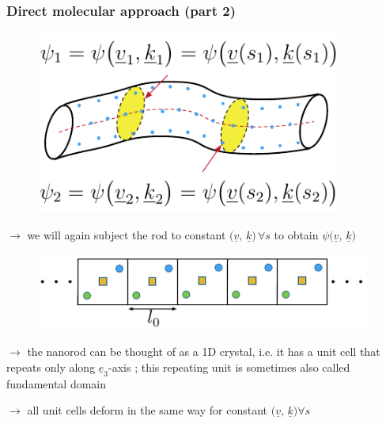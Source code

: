 \begin{frame}
  \frametitle{Direct molecular approach (part 2)}
  \vspace{-0.4em}
  \begin{multicols}{2}
    \begin{figure}
      \centering
      \includegraphics[width=10cm, keepaspectratio=true]{sections/cosserat_rods/images/LocalEnergyNano}
    \end{figure}
    
    \vspace{1em}
    $\rightarrow$ we will again subject the rod to constant $\bigl( \underline{v} , \, \underline{k} \bigr)\, \forall s$ to obtain $\psi \bigl( \underline{v} , \, \underline{k} \bigr)$
    
    \vspace{0.5em}  
    \begin{figure}
      \centering
      \includegraphics[width=11cm, keepaspectratio=true]{sections/cosserat_rods/images/1D-Crystal2}
    \end{figure}
    $\rightarrow$ the nanorod can be thought of as a 1D crystal, i.e. it has a unit cell that repeats only along $\underline{e}_3$-axis ; this repeating unit is sometimes also called fundamental domain
    
    \vspace{1em}
    $\rightarrow$ all unit cells deform in the same way for constant $\bigl( \underline{v} , \, \underline{k} \bigr) \forall s$
  \end{multicols}
  
\end{frame}


